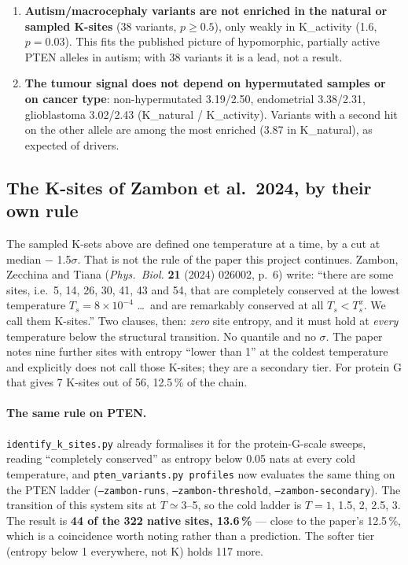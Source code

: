 \documentclass[11pt,a4paper]{article}
\newcommand{\file}[1]{\texttt{#1}}
\begin{document}
\begin{enumerate}
  correlation with tolerance). This is the classification process, not
  biology: a variant at a known critical site gets called pathogenic, and the
  uncertain ones are what remains elsewhere.
\item \textbf{Autism/macrocephaly variants are not enriched in the natural or
  sampled K-sites} (38 variants, $p\ge0.5$), only weakly in K\_activity (1.6,
  $p=0.03$). This fits the published picture of hypomorphic, partially active
  PTEN alleles in autism; with 38 variants it is a lead, not a result.
\item \textbf{The tumour signal does not depend on hypermutated samples or on
  cancer type}: non-hypermutated 3.19/2.50, endometrial 3.38/2.31,
  glioblastoma 3.02/2.43 (K\_natural / K\_activity). Variants with a
  second hit on the other allele are among the most enriched (3.87 in
  K\_natural), as expected of drivers.
\end{enumerate}


\subsection{The K-sites of Zambon et al.\ 2024, by their own rule}\label{sec:zambon}

The sampled K-sets above are defined one temperature at a time, by a cut at
median $-$ 1.5$\sigma$. That is not the rule of the paper this project
continues. Zambon, Zecchina and Tiana (\emph{Phys.\ Biol.} \textbf{21} (2024)
026002, p.~6) write: ``there are some sites, i.e.\ 5, 14, 26, 30, 41, 43 and
54, that are completely conserved at the lowest temperature
$T_s=8\times10^{-4}$ \ldots\ and are remarkably conserved at all
$T_s<T_s^{x}$. We call them K-sites.'' Two clauses, then: \emph{zero} site
entropy, and it must hold at \emph{every} temperature below the structural
transition. No quantile and no $\sigma$. The paper notes nine further sites
with entropy ``lower than 1'' at the coldest temperature and explicitly does
not call those K-sites; they are a secondary tier. For protein G that gives 7
K-sites out of 56, 12.5\,\% of the chain.

\paragraph{The same rule on PTEN.} \file{identify\_k\_sites.py} already
formalises it for the protein-G-scale sweeps, reading ``completely
conserved'' as entropy below 0.05 nats at every cold temperature, and
\texttt{pten\_variants.py profiles} now evaluates the same thing on the PTEN
ladder (\texttt{--zambon-runs}, \texttt{--zambon-threshold},
\texttt{--zambon-secondary}). The transition of this system sits at
$T\simeq3$--5, so the cold ladder is $T=1$, 1.5, 2, 2.5, 3. The result is
\textbf{44 of the 322 native sites, 13.6\,\%} --- close to the paper's
12.5\,\%, which is a coincidence worth noting rather than a prediction. The
softer tier (entropy below 1 everywhere, not K) holds 117 more.
\end{document}
